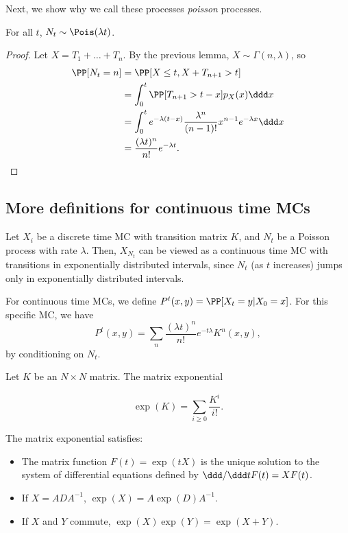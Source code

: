 Next, we show why we call these processes \textit{poisson} processes. 

\begin{theorem}
\proplabel

For all $t$, $N_t\sim \Pois(\lambda t)$. 
\end{theorem}

\begin{proof}
Let $X = T_1 + \hdots + T_n$. By the previous lemma, $X\sim \Gamma(n, \lambda)$, so 
\begin{align*}
	\PP[N_t=n] &= \PP[X\leq t, X + T_{n+1} > t] \\
						 &= \int_0^t \PP[T_{n+1} > t-x]p_X(x) \ddd x \\
						 &= \int_0^t e^{-\lambda(t-x)} \frac{\lambda^n}{(n-1)!}x^{n-1}e^{-\lambda x}\ddd x \\
						 &= \frac{(\lambda t)^n}{n!}e^{-\lambda t}.
\end{align*}
\end{proof}

\subsection{More definitions for continuous time MCs}
 
Let $X_i$ be a discrete time MC with transition matrix $K$, and $N_t$ be a Poisson process with rate $\lambda$. Then, $X_{N_t}$ can be viewed as a continuous time MC with transitions in exponentially distributed intervals, since $N_t$ (as $t$ increases) jumps only in exponentially distributed intervals.

For continuous time MCs, we define $P^t(x,y) = \PP[X_t=y | X_0=x]$. For this specific MC, we have 
\[P^t(x,y) = \sum_n \frac{(\lambda t)^n}{n!}e^{-t\lambda}K^n(x,y),\] 
by conditioning on $N_t$.

\begin{definition}

Let $K$ be an $N\times N$ matrix. The \ac{matrix exponential}

\[\exp(K) = \sum_{i\geq 0}\frac{K^i}{i!}.\] 
\end{definition}

\begin{theorem}
\proplabel

The matrix exponential satisfies: 

\begin{itemize}
	\item The matrix function $F(t) = \exp(tX)$ is the unique solution to the system of differential equations defined by $\ddd / \ddd t F(t) = XF(t)$. 
	\item If $X = ADA^{-1}$, $\exp(X) = A\exp(D)A^{-1}$.
	\item If $X$ and $Y$ commute, $\exp(X)\exp(Y) = \exp(X+Y)$.
\end{itemize}
\end{theorem}

